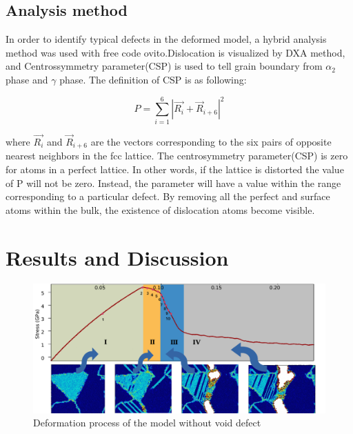 \documentclass[metals,article,submit,moreauthors,pdftex,10pt,a4paper]{Definitions/mdpi}
\begin{document}
	
\subsection{Analysis method}
In order to identify typical defects in the deformed model, a hybrid analysis method was used with free code ovito\cite{Stukowski2010a}.Dislocation is visualized by DXA method, and Centrossymmetry parameter(CSP) is used to tell grain boundary from  $\alpha_2$ phase and $\gamma$ phase. The definition of CSP is as following:

	\begin{equation} \label{eq:csp} 
	P = \displaystyle\sum_{i=1}^{6}|\vec{R_i}+{\vec{R}}_{i+6}|^2
	\end{equation}
	
where $\vec{R_i}$ and ${\vec{R}}_{i+6}$ are the vectors corresponding to the six pairs of opposite nearest neighbors in the fcc lattice. The centrosymmetry parameter(CSP) is zero for atoms in a perfect lattice. In other words, if the lattice is distorted the value of P will not be zero. Instead, the parameter will have a value within the range corresponding to a particular defect. By removing all the perfect and surface atoms within the bulk, the existence of dislocation atoms become visible. 
 
\section{Results and Discussion}\label{section:RD}

\begin{figure}[ht]
	\centering
	\includegraphics[width=1\linewidth]{img/perfect-line2-2}
	\caption{Deformation process of the model without void defect}
	\label{fig:deformation-pf}
\end{figure}
\end{document}
